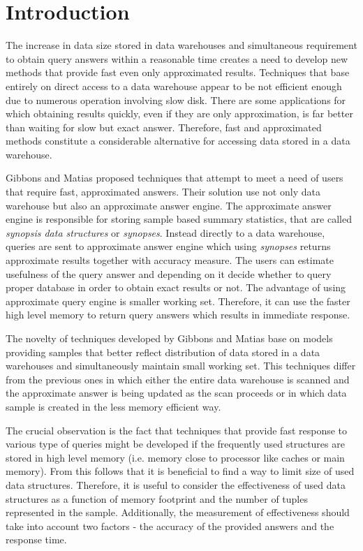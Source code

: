 \section{Introduction}
The increase in data size stored in data warehouses and simultaneous
requirement to obtain query answers within a reasonable time creates a
need to develop new methods that provide fast even only approximated
results. Techniques that base entirely on direct access to a data
warehouse appear to be not efficient enough due to numerous
operation involving slow disk. There are some applications
for which obtaining results quickly, even if they are only
approximation, is far better than waiting for slow but exact
answer. Therefore, fast and approximated methods
constitute a considerable alternative for accessing data stored in a
data warehouse.

Gibbons and Matias \cite{GM98} proposed techniques that attempt to meet a
need of users that require fast, approximated answers. Their solution use not
only data warehouse but also an approximate answer engine.
The approximate answer engine is responsible for storing
sample based summary statistics, that are called \textit{synopsis data
  structures} or \textit{synopses}. Instead
directly to a data warehouse, queries are sent to approximate answer
engine which using \textit{synopses} returns approximate results
together with accuracy measure.
The users can estimate usefulness of the query answer and depending on it
decide whether to query proper database in order to obtain exact results or not.
The advantage of using approximate query engine is smaller working set.
Therefore, it can use the faster high level memory to return query answers
which results in immediate response.

The novelty of techniques developed by Gibbons and Matias
\cite{GM98} base on models providing samples
that better reflect distribution of
data stored in a data warehouses and simultaneously maintain small working set.
This techniques differ from the previous ones in which either the
entire data warehouse is scanned and the approximate answer is being updated as
the scan proceeds or in which data sample is created in the less
memory efficient way.

The crucial observation is the fact that techniques that provide
fast response to various type of queries might be developed if the
frequently used structures are stored in high level memory
(i.e. memory close to processor like caches or main memory). From this follows
that it is beneficial to find a way to limit size of used data structures. Therefore,
it is useful to consider the effectiveness of used data structures
as a function of memory footprint and the number of tuples represented
in the sample. Additionally, the measurement of effectiveness
should take into account two factors - the
accuracy of the provided answers and the response time.

